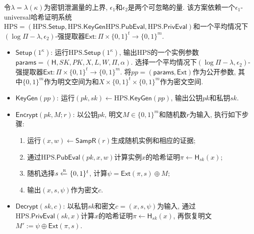 \begin{construction}
令$\lambda = \lambda(\kappa)$为密钥泄漏量的上界, $\epsilon_1$和$\epsilon_2$是两个可忽略的量. 该方案依赖一个$\epsilon_1$-universal哈希证明系统$\text{HPS} = (\text{HPS}.\mathsf{Setup}, \text{HPS}.\mathsf{KeyGen} \text{HPS}.\mathsf{PubEval}, \text{HPS}.\mathsf{PrivEval})$和一个平均情况下$(\log\Pi-\lambda, \epsilon_2)$-强提取器$\mathsf{Ext}: \Pi\times\{0, 1\}^t\rightarrow\{0, 1\}^m$.
\begin{itemize}
\item $\mathsf{Setup}(1^\kappa)$: 运行$\text{HPS}.\mathsf{Setup}(1^\kappa)$, 输出HPS的一个实例参数$\mathsf{params} = (\mathsf{H}, SK, PK, X, L, W, \Pi, \alpha)$. 选择一个平均情况下$(\log\Pi-\lambda, \epsilon_2)$-强提取器$\mathsf{Ext}: \Pi\times\{0, 1\}^t\rightarrow\{0, 1\}^m$. 将$pp = (\mathsf{params}, \mathsf{Ext})$作为公开参数, 其中$\{0, 1\}^m$作为明文空间为和$X \times \{0, 1\}^t \times \{0, 1\}^m$作为密文空间.

\item $\mathsf{KeyGen}(pp)$: 运行$(pk, sk) \leftarrow \text{HPS}.\mathsf{KeyGen}(pp)$, 输出公钥$pk$和私钥$sk$. 
  
\item $\mathsf{Encrypt}(pk, M; r)$: 以公钥$pk$, 明文$M \in \{0, 1\}^m$和随机数$r$为输入, 执行如下步骤:
\begin{enumerate}
    \item 运行$(x, w) \leftarrow \mathsf{SampR}(r)$生成随机实例和相应的证据;
    \item 通过$\text{HPS}.\mathsf{PubEval}(pk, x, w)$计算实例$x$的哈希证明$\pi \leftarrow \mathsf{H}_{sk}(x)$; 
    \item 随机选择$s \xleftarrow{\textup{\tiny R}} \{0, 1\}^t$, 计算$\psi=\mathsf{Ext}(\pi, s)\oplus M$;
    \item 输出$(x, s, \psi)$作为密文$c$. 
\end{enumerate} 

\item $\mathsf{Decrypt}(sk, c)$: 以私钥$sk$和密文$c = (x, s, \psi)$为输入, 通过$\text{HPS}.\mathsf{PrivEval}(sk, x)$计算$x$的哈希证明$\pi \leftarrow \mathsf{H}_{sk}(x)$, 再恢复明文$M':= \psi\oplus\mathsf{Ext}(\pi, s)$.
\end{itemize}
\end{construction}

